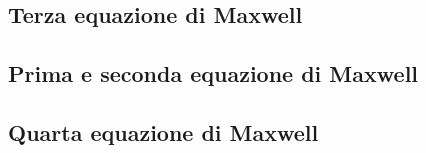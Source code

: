 \subsection{Terza equazione di Maxwell}


\subsection{Prima e seconda equazione di Maxwell}


\subsection{Quarta equazione di Maxwell}

